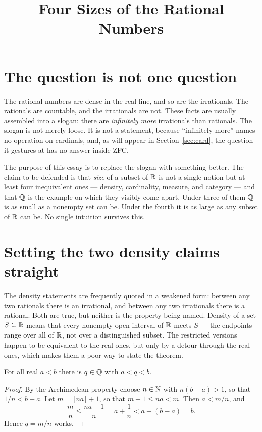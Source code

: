 \documentclass{essay}
\title{Four Sizes of the Rational Numbers}
\author{}
\date{}
\begin{document}
\maketitle

\section{The question is not one question}

The rational numbers are dense in the real line, and so are the
irrationals. The rationals are countable, and the irrationals are not.
These facts are usually assembled into a slogan: there are
\emph{infinitely more} irrationals than rationals. The slogan is not
merely loose. It is not a statement, because ``infinitely more'' names
no operation on cardinals, and, as will appear in Section~\ref{sec:card},
the question it gestures at has no answer inside ZFC.

The purpose of this essay is to replace the slogan with something
better. The claim to be defended is that \emph{size} of a subset of
$\mathbb{R}$ is not a single notion but at least four inequivalent ones ---
density, cardinality, measure, and category --- and that $\Q$ is the
example on which they visibly come apart. Under three of them $\Q$ is
as small as a nonempty set can be. Under the fourth it is as large as
any subset of $\mathbb{R}$ can be. No single intuition survives this.

\section{Setting the two density claims straight}

The density statements are frequently quoted in a weakened form:
between any two rationals there is an irrational, and between any two
irrationals there is a rational. Both are true, but neither is the
property being named. Density of a set $S \subseteq \mathbb{R}$ means that
every nonempty open interval of $\mathbb{R}$ meets $S$ --- the endpoints range
over all of $\mathbb{R}$, not over a distinguished subset. The restricted
versions happen to be equivalent to the real ones, but only by a
detour through the real ones, which makes them a poor way to state the
theorem.

\begin{theorem}[Density of $\Q$]
For all real $a < b$ there is $q \in \mathbb{Q}$ with $a < q < b$.
\end{theorem}

\begin{proof}
By the Archimedean property choose $n \in \mathbb{N}$ with $n(b - a) > 1$, so
that $1/n < b - a$. Let $m = \lfloor na \rfloor + 1$, so that
$m - 1 \leq na < m$. Then $a < m/n$, and
\[
  \frac{m}{n} \leq \frac{na + 1}{n} = a + \frac{1}{n} < a + (b - a) = b .
\]
Hence $q = m/n$ works.
\end{proof}
\end{document}
